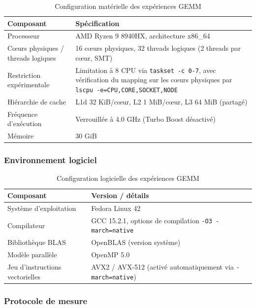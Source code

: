 \documentclass[a4paper,11pt,oneside]{article}
\begin{document}
\begin{table}[H]
\centering
\begin{tabular}{p{}p{}}
\toprule
\textbf{Composant} & \textbf{Spécification} \\
\midrule
Processeur & AMD Ryzen 9 8940HX, architecture x86\_64 \\
Cœurs physiques / threads logiques & 16 cœurs physiques, 32 threads logiques (2 threads par cœur, SMT)\\
Restriction expérimentale & Limitation à 8 CPU via \texttt{taskset -c 0-7}, avec vérification du mapping sur les cœurs physiques par \texttt{lscpu -e=CPU,CORE,SOCKET,NODE} \\
Hiérarchie de cache & L1d 32 KiB/cœur, L2 1 MiB/cœur, L3 64 MiB (partagé)\\
Fréquence d'exécution & Verrouillée à 4.0 GHz (Turbo Boost désactivé)\\
Mémoire & 30 GiB \\
\bottomrule
\end{tabular}
\caption{Configuration matérielle des expériences GEMM}
\label{tab:gemm_hardware}
\end{table}

\subsubsection{Environnement logiciel}

\begin{table}[H]
\centering
\begin{tabular}{p{}p{}}
\toprule
\textbf{Composant} & \textbf{Version / détails} \\
\midrule
Système d'exploitation & Fedora Linux 42 \\
Compilateur & GCC 15.2.1, options de compilation \texttt{-O3 -march=native} \\
Bibliothèque BLAS & OpenBLAS (version système)\\
Modèle parallèle & OpenMP 5.0 \\
Jeu d'instructions vectorielles & AVX2 / AVX-512 (activé automatiquement via \texttt{-march=native})\\
\bottomrule
\end{tabular}
\caption{Configuration logicielle des expériences GEMM}
\label{tab:gemm_software}
\end{table}

\subsubsection{Protocole de mesure}\label{subsec:gemm_protocol}
\end{document}
